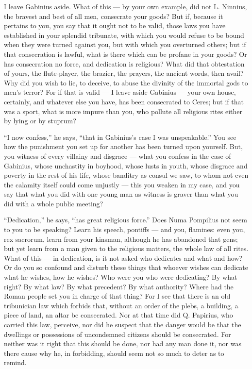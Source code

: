  I leave Gabinius aside. What of this --- by your own example, did not L. Ninnius, the bravest and best of all men, consecrate your goods? But if, because it pertains to you, you say that it ought not to be valid, those laws you have established in your splendid tribunate, with which you would refuse to be bound when they were turned against you, but with which you overturned others; but if that consecration is lawful, what is there which can be profane in your goods? Or has consecration no force, and dedication is religious? What did that obtestation of yours, the flute-player, the brazier, the prayers, the ancient words, then avail? Why did you wish to lie, to deceive, to abuse the divinity of the immortal gods to men's terror? For if that is valid --- I leave aside Gabinius --- your own house, certainly, and whatever else you have, has been consecrated to Ceres; but if that was a sport, what is more impure than you, who pollute all religious rites either by lying or by stuprum?

 ``I now confess,'' he says, ``that in Gabinius's case I was unspeakable.'' You see how the punishment you set up for another has been turned upon yourself. But, you witness of every villainy and disgrace --- what you confess in the case of Gabinius, whose unchastity in boyhood, whose lusts in youth, whose disgrace and poverty in the rest of his life, whose banditry as consul we saw, to whom not even the calamity itself could come unjustly --- this you weaken in my case, and you say that what you did with one young man as witness is graver than what you did with a whole public meeting?

 ``Dedication,'' he says, ``has great religious force.'' Does Numa Pompilius not seem to you to be speaking? Learn his speech, pontiffs --- and you, flamines: even you, rex sacrorum, learn from your kinsman, although he has abandoned that gens; but yet learn from a man given to the religious matters, the whole law of all rites. What of this --- in dedication, is it not asked who dedicates and what and how? Or do you so confound and disturb these things that whoever wishes can dedicate what he wishes, how he wishes? Who were you who were dedicating? By what right? By what law? By what precedent? By what authority? Where had the Roman people set you in charge of that thing? For I see that there is an old tribunician law which forbids that, without an order of the plebs, a building, a piece of land, an altar be consecrated. Nor at that time did Q. Papirius, who carried this law, perceive, nor did he suspect that the danger would be that the dwellings or possessions of uncondemned citizens should be consecrated. For neither was it right that this should be done, nor had any man done it, nor was there cause why he, in forbidding, should seem not so much to deter as to remind.

